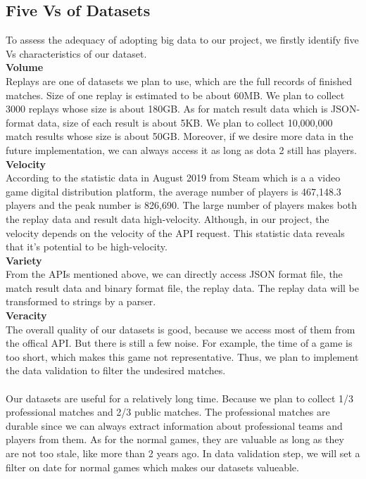 \documentclass{article}
\begin{document}
\subsection{Five Vs of Datasets}
To assess the adequacy of adopting big data to our project, we firstly identify five Vs characteristics of our dataset.\\
\textbf{Volume}\\
Replays are one of datasets we plan to use, which are the full records of finished matches. Size of one replay is estimated to be about 60MB. We plan to collect 3000 replays whose size is about 180GB. As for match result data which is JSON-format data, size of each result is about 5KB. We plan to collect 10,000,000 match results whose size is about 50GB. Moreover, if we desire more data in the future implementation, we can always access it as long as dota 2 still has players.\\
\textbf{Velocity}\\
According to the statistic data in August 2019 from Steam which is a a video game digital distribution platform, the average number of players is 467,148.3 players and the peak number is 826,690. The large number of players makes both the replay data and result data high-velocity. Although, in our project, the velocity depends on the velocity of the API request. This statistic data reveals that it's potential to be high-velocity.\\
\textbf{Variety}\\
From the APIs mentioned above, we can directly access JSON format file, the match result data and binary format file, the replay data. The replay data will be transformed to strings by a parser.\\
\textbf{Veracity}\\
The overall quality of our datasets is good, because we access most of  them from the offical API. But there is still a few noise. For example, the time of a game is too short, which makes this game not representative. Thus, we plan to implement the data validation to filter the undesired matches.\\
\\
Our datasets are useful for a relatively long time. Because we plan to collect 1/3 professional matches and 2/3 public matches. The professional matches are durable since we can always extract information about professional teams and players from them. As for the normal games, they are valuable as long as they are not too stale, like more than 2 years ago. In data validation step, we will set a filter on date for normal games which makes our datasets valueable.
\end{document}
